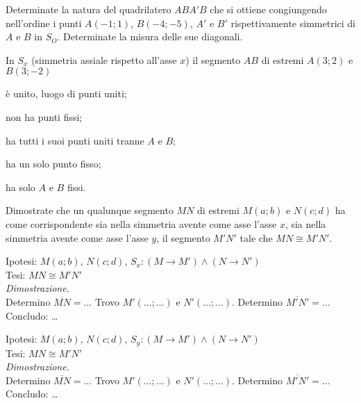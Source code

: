 \begin{esercizio}
	\label{ese:8.15}
	Determinate la natura del quadrilatero \(ABA'B\) che si ottiene 
	congiungendo nell'ordine i punti \(A(-1;1)\), \(B(-4;-5)\), \(A'\) e \(B'\) 
	rispettivamente simmetrici di \(A\) e \(B\) in \(S_O\). Determinate la 
	misura delle sue diagonali.
\end{esercizio}

\begin{esercizio}
	\label{ese:8.27}
	In \(S_x\) (simmetria assiale rispetto all'asse \(x\)) il segmento \(AB\) 
	di estremi \(A(3;2)\) e \(B(3;-2)\)
	\begin{enumeratea}
		\item è unito, luogo di punti uniti;
		\item non ha punti fissi;
		\item ha tutti i suoi punti uniti tranne \(A\) e \(B\);
		\item ha un solo punto fisso;
		\item ha solo \(A\) e \(B\) fissi.
	\end{enumeratea}
\end{esercizio}

\begin{esercizio}
	\label{ese:8.28}
	Dimostrate che un qualunque segmento \(MN\) di estremi \(M(a;b)\) e 
	\(N(c;d)\) ha come corrispondente sia nella simmetria avente come asse 
	l'asse \(x\), sia nella simmetria avente come asse l'asse \(y\), il 
	segmento \(M'N'\) tale che \(MN\cong M'N'\).\vspace{5pt}
	
	\noindent Ipotesi: \(M(a;b)\), \(N(c;d)\), \(S_x:(M\rightarrow M') \wedge 
	(N\rightarrow N')\)\\
	Tesi: \(MN\cong M'N'\)\vspace{3pt}\\
	\emph{Dimostrazione.}\\
	Determino \(\overline{MN}=\ldots{}\) Trovo \(M'(\ldots{};\ldots{})\) e 
	\(N'(\ldots{};\ldots{})\). Determino \(\overline{M'N'}=\ldots{}\)\\
	Concludo: \ldots{}\vspace{5pt}
	
	\noindent Ipotesi: \(M(a;b)\), \(N(c;d)\), \(S_y:(M\rightarrow M') \wedge 
	(N\rightarrow N')\)\\
	Tesi: \(MN\cong M'N'\)\vspace{3pt}\\
	\emph{Dimostrazione.}\\
	Determino \(\overline{MN}=\ldots{}\) Trovo \(M'(\ldots{};\ldots{})\) e 
	\(N'(\ldots{};\ldots{})\). Determino \(\overline{M'N'}=\ldots{}\)\\
	Concludo: \ldots{}
\end{esercizio}

